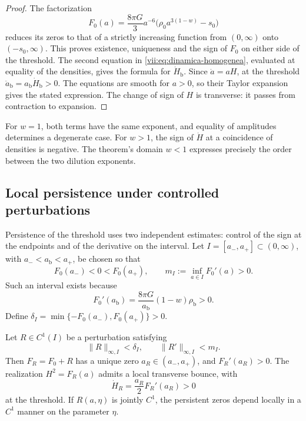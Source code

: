 \begin{proof}
The factorization
\[
 F_0(a)=\frac{8\pi G}{3}a^{-6}
             \bigl(\rho_0a^{3(1-w)}-s_0\bigr)
\]
reduces its zeros to that of a strictly increasing function from
\((0,\infty)\) onto \((-s_0,\infty)\). This proves existence,
uniqueness and the sign of \(F_0\) on either side of the threshold.
The second equation in \eqref{vii:eq:dinamica-homogenea}, evaluated
at equality of the densities, gives the formula for \(\dot H_{\mathrm b}\).
Since \(\dot a=aH\), at the threshold
\(\ddot a_{\mathrm b}=a_{\mathrm b}\dot H_{\mathrm b}>0\).
The equations are smooth for \(a>0\), so their Taylor expansion
gives the stated expression. The change of sign of \(H\) is
transverse: it passes from contraction to expansion.
\end{proof}

For \(w=1\), both terms have the same exponent, and equality of
amplitudes determines a degenerate case. For \(w>1\), the sign of
\(\dot H\) at a coincidence of densities is negative.
The theorem's domain \(w<1\) expresses precisely the order between
the two dilution exponents.

\subsection{Local persistence under controlled perturbations}
\label{vii:sec:persistencia}

Persistence of the threshold uses two independent estimates:
control of the sign at the endpoints and of the derivative on the
interval. Let \(I=[a_-,a_+]\subset(0,\infty)\), with
\(a_-<a_{\mathrm b}<a_+\), be chosen so that
\[
 F_0(a_-)<0<F_0(a_+),\qquad
 m_I:=\inf_{a\in I}F_0'(a)>0.
\]
Such an interval exists because
\[
 F_0'(a_{\mathrm b})
   =\frac{8\pi G}{a_{\mathrm b}}(1-w)\rho_{\mathrm b}>0.
\]
Define
\(\delta_I=\min\{-F_0(a_-),F_0(a_+)\}>0\).

\begingroup\fontsize{10}{11.7}\selectfont
\setlength{\parskip}{2pt}\setlength{\abovedisplayskip}{5pt}\setlength{\belowdisplayskip}{5pt}
\begin{theorem}
\label{vii:thm:persistencia}
Let \(R\in C^1(I)\) be a perturbation satisfying
\[
 \|R\|_{\infty,I}<\delta_I,\qquad
 \|R'\|_{\infty,I}<m_I.
\]
Then \(F_R=F_0+R\) has a unique zero \(a_R\in(a_-,a_+)\), and
\(F_R'(a_R)>0\). The realization \(H^2=F_R(a)\) admits a local
transverse bounce, with
\[
 \dot H_R=\frac{a_R}{2}F_R'(a_R)>0
\]
at the threshold. If \(R(a,\eta)\) is jointly \(C^1\), the persistent
zeros depend locally in a \(C^1\) manner on the parameter \(\eta\).
\end{theorem}

